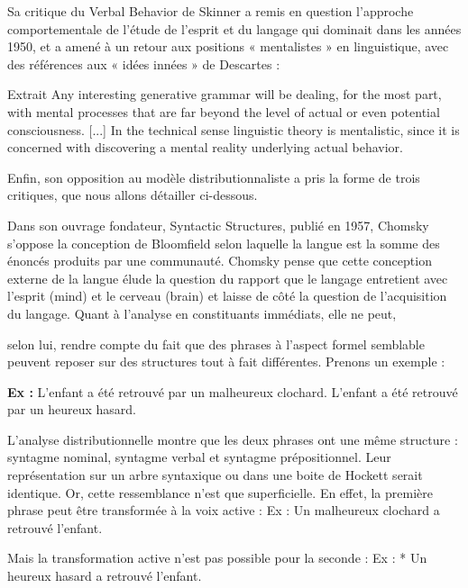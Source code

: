 Sa critique du Verbal Behavior de Skinner a remis en question l’approche comportementale de l’étude de l’esprit et du langage qui dominait dans les années 1950, et a amené à un retour aux positions « mentalistes » en linguistique, avec des références aux « idées innées » de Descartes : 
\begin{lecture}{Extrait}
Any interesting generative grammar will be dealing, for the most part, with mental processes that are far beyond the level of actual or even potential consciousness. [...] In the technical sense linguistic theory is mentalistic, since it is concerned with discovering a mental reality underlying actual behavior.
\end{lecture}
 Enfin, son opposition au modèle distributionnaliste a pris la forme de trois critiques, que nous allons détailler ci-dessous.\par

Dans son ouvrage fondateur, Syntactic Structures, publié en 1957, Chomsky s’oppose la conception de Bloomfield selon laquelle la langue est la somme des énoncés produits par une communauté. Chomsky pense que cette conception externe de la langue élude la question du rapport que le langage entretient avec l’esprit (mind) et le cerveau (brain) et laisse de côté la question de l’acquisition du langage. Quant à l’analyse en constituants immédiats, elle ne peut,\par


selon lui, rendre compte du fait que des phrases à l’aspect formel semblable peuvent reposer sur des structures tout à fait différentes. Prenons un exemple :\par

\noindent\textbf{Ex :} L'enfant a été retrouvé par un malheureux clochard. L'enfant a été retrouvé par un heureux hasard.\par

L'analyse distributionnelle montre que les deux phrases ont une même structure : syntagme nominal, syntagme verbal et syntagme prépositionnel. Leur représentation sur un arbre syntaxique ou dans une boite de Hockett serait identique. Or, cette ressemblance n’est que superficielle. En effet, la première phrase peut être transformée à la voix active : Ex : Un malheureux clochard a retrouvé l’enfant.\par

Mais la transformation active n’est pas possible pour la seconde : Ex : * Un heureux hasard a retrouvé l’enfant.\par

